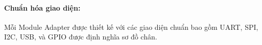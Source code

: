            \paragraph{Chuẩn hóa giao diện:}\par
                Mỗi Module Adapter được thiết kế với các giao diện chuẩn bao gồm UART, SPI, I2C, USB, và GPIO được định nghĩa sơ đồ chân.
